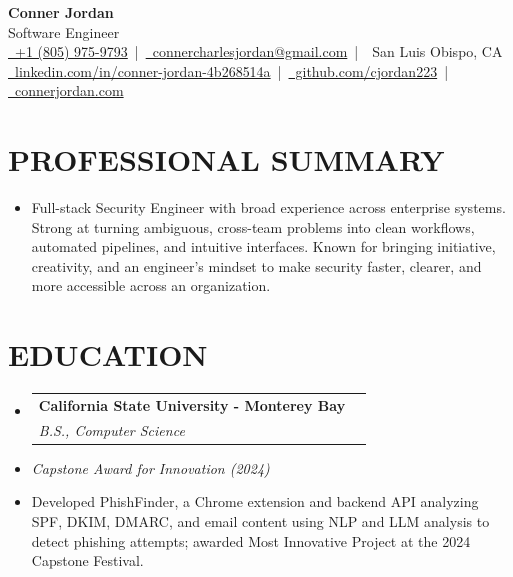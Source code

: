 \documentclass[letterpaper,10pt]{article}
\makeatletter
\newcommand{\resumeSubHeadingListStart}{\begin{itemize}[leftmargin=0in,label={}]}
\newcommand{\resumeSubHeadingListEnd}{\end{itemize}}
\newcommand{\resumeSubheading}[4]{%
  \vspace{-2pt}\item
  \begin{tabular*}{\textwidth}[t]{l@{\extracolsep{\fill}}r}
    \textbf{\large #1} & \textbf{\small #2} \\
    \textit{\large #3} & \textit{\small #4} \\
  \end{tabular*}\vspace{-2pt}
}
\makeatother
\begin{document}
\begin{center}
  {\Huge \textbf{Conner Jordan}}\\[0pt]
  {\Large Software Engineer}\\[0pt]
  \href{tel:+18059759793}{\faPhone\ +1 (805) 975-9793} \,|\, 
  \href{mailto:connercharlesjordan@gmail.com}{\faEnvelope\ connercharlesjordan@gmail.com} \,|\, 
  \faMapMarker\ San Luis Obispo, CA \\[-2pt]
  \href{https://www.linkedin.com/in/conner-jordan-4b268514a/}{\faLinkedin\ linkedin.com/in/conner-jordan-4b268514a}
  \,|\, \href{https://github.com/cjordan223}{\faGithub\ github.com/cjordan223}
  \,|\, \href{https://connerjordan.com/}{\faGlobe\ connerjordan.com}
\end{center}

\vspace{4pt}

\section{PROFESSIONAL SUMMARY}
\vspace{8pt}
\resumeSubHeadingListStart
\item \small{
Full-stack Security Engineer with broad experience across enterprise systems. Strong at turning ambiguous, cross-team problems into clean workflows, automated pipelines, and intuitive interfaces. Known for bringing initiative, creativity, and an engineer's mindset to make security faster, clearer, and more accessible across an organization.
}
\resumeSubHeadingListEnd
\vspace{6pt}

\section{EDUCATION}
\vspace{8pt}
\resumeSubHeadingListStart
  \resumeSubheading
    {California State University - Monterey Bay}{}
    {B.S., Computer Science}{}
  \item \small{\textit{Capstone Award for Innovation (2024)}}
  \item \small{Developed PhishFinder, a Chrome extension and backend API analyzing SPF, DKIM, DMARC, and email content using NLP and LLM analysis to detect phishing attempts; awarded Most Innovative Project at the 2024 Capstone Festival.}
\resumeSubHeadingListEnd
\vspace{6pt}

\end{document}
